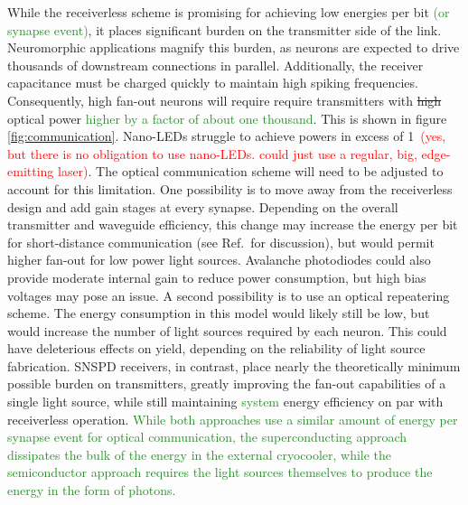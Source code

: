 \documentclass[twocolumn]{article}
\begin{document}
While the receiverless scheme is promising for achieving low energies per bit \textcolor{ForestGreen}{(or synapse event)}, it places significant burden on the transmitter side of the link. Neuromorphic applications magnify this burden, as neurons are expected to drive thousands of downstream connections in parallel. Additionally, the receiver capacitance must be charged quickly to maintain high spiking frequencies. Consequently, high fan-out neurons will require require transmitters with \sout{high} optical power \textcolor{ForestGreen}{higher by a factor of about one thousand}. This is shown in figure \ref{fig:communication}. Nano-LEDs struggle to achieve powers in excess of 1\,\textmuW \cite{romeira2019physical} \textcolor{red}{(yes, but there is no obligation to use nano-LEDs. could just use a regular, big, edge-emitting laser)}. The optical communication scheme will need to be adjusted to account for this limitation. One possibility is to move away from the receiverless design and add gain stages at every synapse. Depending on the overall transmitter and waveguide efficiency, this change may increase the energy per bit for short-distance communication (see Ref.\, for discussion), but would permit higher fan-out for low power light sources. Avalanche photodiodes could also provide moderate internal gain to reduce power consumption, but high bias voltages may pose an issue. A second possibility is to use an optical repeatering scheme. The energy consumption in this model would likely still be low, but would increase the number of light sources required by each neuron. This could have deleterious effects on yield, depending on the reliability of light source fabrication. SNSPD receivers, in contrast, place nearly the theoretically minimum possible burden on transmitters, greatly improving the fan-out capabilities of a single light source, while still maintaining \textcolor{ForestGreen}{system} energy efficiency on par with receiverless operation. \textcolor{ForestGreen}{While both approaches use a similar amount of energy per synapse event for optical communication, the superconducting approach dissipates the bulk of the energy in the external cryocooler, while the semiconductor approach requires the light sources themselves to produce the energy in the form of photons.}
\end{document}
